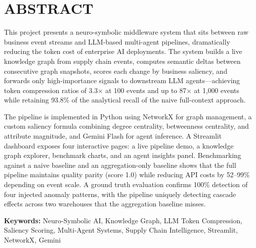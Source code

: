 \chapter*{ABSTRACT}

This project presents a neuro-symbolic middleware system that sits between raw business event
streams and LLM-based multi-agent pipelines, dramatically reducing the token cost of enterprise
AI deployments. The system builds a live knowledge graph from supply chain events, computes
semantic deltas between consecutive graph snapshots, scores each change by business saliency,
and forwards only high-importance signals to downstream LLM agents---achieving token compression
ratios of 3.3$\times$ at 100 events and up to 87$\times$ at 1,000 events while retaining 93.8\%
of the analytical recall of the naive full-context approach.

The pipeline is implemented in Python using NetworkX for graph management, a custom
saliency formula combining degree centrality, betweenness centrality, and attribute magnitude,
and Gemini Flash for agent inference. A Streamlit dashboard exposes four interactive pages:
a live pipeline demo, a knowledge graph explorer, benchmark charts, and an agent insights panel.
Benchmarking against a naive baseline and an aggregation-only baseline shows that the full
pipeline maintains quality parity (score 1.0) while reducing API costs by 52--99\% depending
on event scale. A ground truth evaluation confirms 100\% detection of four injected anomaly
patterns, with the pipeline uniquely detecting cascade effects across two warehouses that the
aggregation baseline misses.

\textbf{Keywords:} Neuro-Symbolic AI, Knowledge Graph, LLM Token Compression, Saliency
Scoring, Multi-Agent Systems, Supply Chain Intelligence, Streamlit, NetworkX, Gemini

